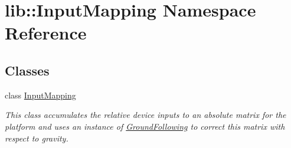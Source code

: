 \hypertarget{namespacelib_1_1InputMapping}{\section{lib\-:\-:\-Input\-Mapping \-Namespace \-Reference}
\label{namespacelib_1_1InputMapping}
}
\subsection*{\-Classes}
\begin{DoxyCompactItemize}
\item 
class \hyperlink{classlib_1_1InputMapping_1_1InputMapping}{\-Input\-Mapping}
\begin{DoxyCompactList}\small\item\em \-This class accumulates the relative device inputs to an absolute matrix for the platform and uses an instance of \hyperlink{namespacelib_1_1GroundFollowing}{\-Ground\-Following} to correct this matrix with respect to gravity. \end{DoxyCompactList}\end{DoxyCompactItemize}
